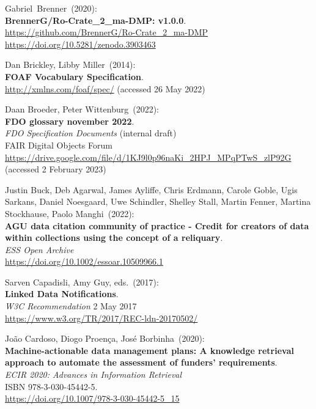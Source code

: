 \begin{thebibliography}{9}
Gabriel~Brenner~(2020): \\
\textbf{BrennerG/Ro-Crate\_2\_ma-DMP: v1.0.0}.\\
\url{https://github.com/BrennerG/Ro-Crate_2_ma-DMP}\\
\url{https://doi.org/10.5281/zenodo.3903463}

Dan Brickley, Libby Miller~(2014): \\
\textbf{FOAF Vocabulary Specification}.\\
\url{http://xmlns.com/foaf/spec/} (accessed 26 May 2022)

Daan Broeder, Peter Wittenburg~(2022): \\
\textbf{{FDO} glossary november 2022}.\\
\emph{FDO Specification Documents} (internal draft)\\
FAIR Digital Objects Forum
\url{https://drive.google.com/file/d/1KJ9l0p96naKi_2HPJ_MPqPTwS_zlP92G}
(accessed 2 February 2023)

Justin Buck, Deb Agarwal, James Ayliffe, Chris Erdmann, Carole Goble, Ugis Sarkans, Daniel Noesgaard, Uwe Schindler, Shelley Stall, Martin Fenner, Martina Stockhause, Paolo Manghi~(2022): \\
\textbf{AGU data citation community of practice - Credit for creators of data within collections using the concept of a reliquary}.\\ 
\emph{ESS Open Archive}\\
\url{https://doi.org/10.1002/essoar.10509966.1}


Sarven Capadisli, Amy Guy, eds.~(2017): \\
\textbf{Linked Data Notifications}.\\
\emph{W3C Recommendation} 2 May 2017 \\
\url{https://www.w3.org/TR/2017/REC-ldn-20170502/}

João Cardoso, Diogo Proença, José Borbinha~(2020): \\
\textbf{Machine-actionable data management plans: A knowledge retrieval
approach to automate the assessment of funders' requirements}.\\
\emph{ECIR 2020: Advances in Information Retrieval}\\
ISBN 978-3-030-45442-5.\\
\url{https://doi.org/10.1007/978-3-030-45442-5_15}


\end{thebibliography}
